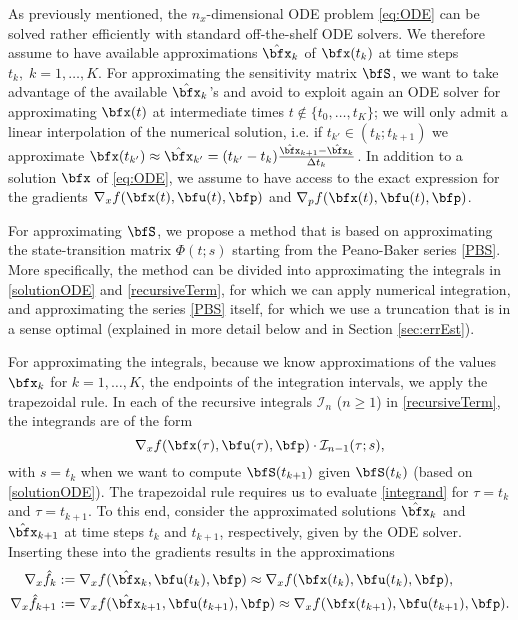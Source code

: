 \documentclass[DIV=12]{scrartcl} %
\theoremstyle{definition}
\begin{document}
As previously mentioned, the $n_x$-dimensional ODE problem \eqref{eq:ODE} can be solved rather efficiently with standard off-the-shelf ODE solvers. 
We therefore assume to have available approximations $\hat{\bfx} _k$ of $ \bfx(t_k)$ at time steps $t_k,\;k=1,\dots,K$. 
For approximating the sensitivity matrix $\bfS$, we want to take advantage of the available $\hat{\bfx}_k$'s and avoid to exploit again an ODE solver for approximating $\bfx(t)$ at intermediate times $t \notin \{t_0, \dots, t_K\}$; we will only admit a linear interpolation of the numerical solution, i.e. if $t_{k'}\in(t_k;t_{k+1})$ we approximate $\bfx(t_{k'})\approx \hat{\bfx}_{k'}=(t_{k'}-t_k)\frac{\hat{\bfx}_{k+1}-\hat{\bfx}_k}{\Delta t_k}$. In addition to a solution $\bfx$ of \eqref{eq:ODE}, we assume to have access to the exact expression for the gradients $\nabla_x f(\bfx(t),\bfu(t),\bfp)$ and $\nabla_p f(\bfx(t),\bfu(t),\bfp)$.

For approximating $\bfS$, we propose a method that is based on approximating the state-transition matrix $\Phi(t;s)$ starting from the Peano-Baker series \eqref{PBS}. More specifically, the method can be divided into approximating the integrals in \eqref{solutionODE} and \eqref{recursiveTerm}, for which we can apply numerical integration, and approximating the series \eqref{PBS} itself, for which we use a truncation that is in a sense optimal (explained in more detail below and in Section \ref{sec:errEst}).

For approximating the integrals, because we know approximations of the values $\bfx_k$ for $k=1, \dots, K$, the endpoints of the integration intervals, we apply the trapezoidal rule.
In each of the recursive integrals $\mathcal{I}_{n}$ ($n\ge1$) in \eqref{recursiveTerm}, the integrands are of the form
\begin{equation}
\label{integrand}
    \nabla_x f(\bfx(\tau),\bfu(\tau),\bfp)\cdot\mathcal{I}_{n-1}(\tau;s),
\end{equation}
with $s=t_k$ when we want to compute $\bfS(t_{k+1})$ given $\bfS(t_k)$ (based on \eqref{solutionODE}). The trapezoidal rule requires us to evaluate \eqref{integrand} for $\tau = t_k$ and $\tau=t_{k+1}$. To this end, consider the approximated solutions $\hat \bfx _k$ and $\hat \bfx_{k+1}$ at time steps $t_k$ and $t_{k+1}$, respectively, given by the ODE solver. Inserting these into the gradients results in the approximations 
\begin{align}
\label{Jac_x}
    \nabla_x\hat{f}_k &:=\nabla_xf(\hat \bfx _k,\bfu(t_k),\bfp) \approx \nabla_xf(\bfx(t_k),\bfu(t_k),\bfp), \\
    \nabla_x\hat{f}_{k+1} &:=\nabla_xf(\hat \bfx _{k+1},\bfu(t_{k+1}),\bfp)\approx \nabla_xf(\bfx(t_{k+1}),\bfu(t_{k+1}),\bfp).\nonumber
\end{align}
\end{document}
